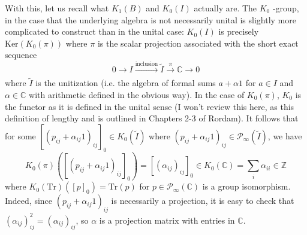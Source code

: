 \documentclass[aps,pra,showpacs,notitlepage,onecolumn,superscriptaddress,nofootinbib]{revtex4-1}
\theoremstyle{definition}
\begin{document}
With this, let us recall what $K_1(B)$ and $K_0(I)$ actually are. The $K_0$ -group, in the case that the underlying algebra is not necessarily unital
is slightly more complicated to construct than in the unital case: $K_0(I)$ is precisely $\text{Ker}(K_0(\pi))$ where $\pi$ is the scalar projection
associated with the short exact sequence
\begin{equation}
0 \longrightarrow I \xrightarrow[]{\text{inclusion}} \widetilde{I} \xrightarrow[]{\pi} \mathbb{C} \longrightarrow 0
\end{equation}
where $\widetilde{I}$ is the unitization (i.e. the algebra of formal sums $a + \alpha 1$ for $a \in I$ and $\alpha \in \mathbb{C}$ with arithmetic defined in the obvious way).
In the case of $K_0(\pi)$, $K_0$ is the functor as it is defined in the unital sense (I won't review this here, as this definition of lengthy and is outlined in Chapters 2-3 of Rordam).
It follows that for some $[(p_{ij} + \alpha_{ij} 1)_{ij}]_0 \in K_0(\widetilde{I})$ where $(p_{ij} + \alpha_{ij} 1)_{ij} \in \mathcal{P}_{\infty}(\widetilde{I})$, we have
\begin{equation}
K_0(\pi)([(p_{ij} + \alpha_{ij} 1)_{ij}]_0) = [(\alpha_{ij})_{ij}]_0 \in K_0(\mathbb{C}) = \displaystyle\sum_{i} \alpha_{ii} \in \mathbb{Z}
\end{equation}
where $K_0(\text{Tr})([p]_0) = \text{Tr}(p)$ for $p \in \mathcal{P}_{\infty}(\mathbb{C})$ is a group isomorphism. Indeed,
since $(p_{ij} + \alpha_{ij} 1)_{ij}$ is necessarily a projection, it is easy to check that $(\alpha_{ij})_{ij}^2 = (\alpha_{ij})_{ij}$, so $\alpha$ is a projection matrix with entries in $\mathbb{C}$.
\end{document}
